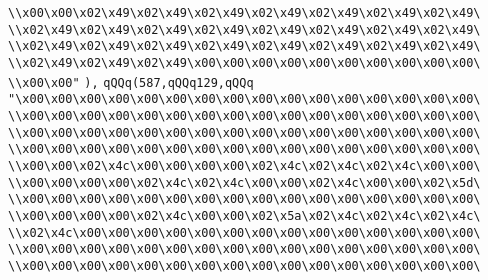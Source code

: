 \verb|\\x00\x00\x02\x49\x02\x49\x02\x49\x02\x49\x02\x49\x02\x49\x02\x49\|\newline
\verb|\\x02\x49\x02\x49\x02\x49\x02\x49\x02\x49\x02\x49\x02\x49\x02\x49\|\newline
\verb|\\x02\x49\x02\x49\x02\x49\x02\x49\x02\x49\x02\x49\x02\x49\x02\x49\|\newline
\verb|\\x02\x49\x02\x49\x02\x49\x00\x00\x00\x00\x00\x00\x00\x00\x00\x00\|\newline
\verb|\\x00\x00"|\newline
\verb|),|\newline
\verb|qQQq(587,qQQq129,qQQq|\newline
\verb|"\x00\x00\x00\x00\x00\x00\x00\x00\x00\x00\x00\x00\x00\x00\x00\x00\|\newline
\verb|\\x00\x00\x00\x00\x00\x00\x00\x00\x00\x00\x00\x00\x00\x00\x00\x00\|\newline
\verb|\\x00\x00\x00\x00\x00\x00\x00\x00\x00\x00\x00\x00\x00\x00\x00\x00\|\newline
\verb|\\x00\x00\x00\x00\x00\x00\x00\x00\x00\x00\x00\x00\x00\x00\x00\x00\|\newline
\verb|\\x00\x00\x02\x4c\x00\x00\x00\x00\x02\x4c\x02\x4c\x02\x4c\x00\x00\|\newline
\verb|\\x00\x00\x00\x00\x02\x4c\x02\x4c\x00\x00\x02\x4c\x00\x00\x02\x5d\|\newline
\verb|\\x00\x00\x00\x00\x00\x00\x00\x00\x00\x00\x00\x00\x00\x00\x00\x00\|\newline
\verb|\\x00\x00\x00\x00\x02\x4c\x00\x00\x02\x5a\x02\x4c\x02\x4c\x02\x4c\|\newline
\verb|\\x02\x4c\x00\x00\x00\x00\x00\x00\x00\x00\x00\x00\x00\x00\x00\x00\|\newline
\verb|\\x00\x00\x00\x00\x00\x00\x00\x00\x00\x00\x00\x00\x00\x00\x00\x00\|\newline
\verb|\\x00\x00\x00\x00\x00\x00\x00\x00\x00\x00\x00\x00\x00\x00\x00\x00\|\newline
